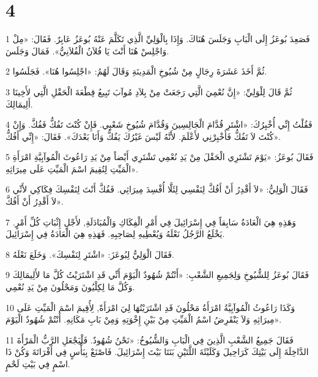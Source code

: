 \chapter{4}

\par 1 فَصَعِدَ بُوعَزُ إِلَى الْبَابِ وَجَلَسَ هُنَاكَ. وَإِذَا بِالْوَلِيِّ الَّذِي تَكَلَّمَ عَنْهُ بُوعَزُ عَابِرٌ. فَقَالَ: «مِلْ وَاجْلِسْ هُنَا أَنْتَ يَا فُلاَنُ الْفُلاَنِيُّ». فَمَالَ وَجَلَسَ.
\par 2 ثُمَّ أَخَذَ عَشَرَةَ رِجَالٍ مِنْ شُيُوخِ الْمَدِينَةِ وَقَالَ لَهُمُ: «اجْلِسُوا هُنَا». فَجَلَسُوا.
\par 3 ثُمَّ قَالَ لِلْوَلِيِّ: «إِنَّ نُعْمِيَ الَّتِي رَجَعَتْ مِنْ بِلاَدِ مُوآبَ تَبِيعُ قِطْعَةَ الْحَقْلِ الَّتِي لأَخِينَا أَلِيمَالِكَ.
\par 4 فَقُلْتُ إِنِّي أُخْبِرُكَ: «اشْتَرِ قُدَّامَ الْجَالِسِينَ وَقُدَّامَ شُيُوخِ شَعْبِي. فَإِنْ كُنْتَ تَفُكُّ فَفُكَّ. وَإِنْ كُنْتَ لاَ تَفُكُّ فَأَخْبِرْنِي لأَعْلَمَ. لأَنَّهُ لَيْسَ غَيْرُكَ يَفُكُّ وَأَنَا بَعْدَكَ». فَقَالَ: «إِنِّي أَفُكُّ».
\par 5 فَقَالَ بُوعَزُ: «يَوْمَ تَشْتَرِي الْحَقْلَ مِنْ يَدِ نُعْمِي تَشْتَرِي أَيْضاً مِنْ يَدِ رَاعُوثَ الْمُوآبِيَّةِ امْرَأَةِ الْمَيِّتِ لِتُقِيمَ اسْمَ الْمَيِّتِ عَلَى مِيرَاثِهِ».
\par 6 فَقَالَ الْوَلِيُّ: «لاَ أَقْدِرُ أَنْ أَفُكَّ لِنَفْسِي لِئَلَّا أُفْسِدَ مِيرَاثِي. فَفُكَّ أَنْتَ لِنَفْسِكَ فِكَاكِي لأَنِّي لاَ أَقْدِرُ أَنْ أَفُكَّ».
\par 7 وَهَذِهِ هِيَ الْعَادَةُ سَابِقاً فِي إِسْرَائِيلَ فِي أَمْرِ الْفِكَاكِ وَالْمُبَادَلَةِ, لأَجْلِ إِثْبَاتِ كُلِّ أَمْرٍ. يَخْلَعُ الرَّجُلُ نَعْلَهُ وَيُعْطِيهِ لِصَاحِبِهِ. فَهَذِهِ هِيَ الْعَادَةُ فِي إِسْرَائِيلَ.
\par 8 فَقَالَ الْوَلِيُّ لِبُوعَزَ: «اشْتَرِ لِنَفْسِكَ». وَخَلَعَ نَعْلَهُ.
\par 9 فَقَالَ بُوعَزُ لِلشُّيُوخِ وَلِجَمِيعِ الشَّعْبِ: «أَنْتُمْ شُهُودٌ الْيَوْمَ أَنِّي قَدِ اشْتَرَيْتُ كُلَّ مَا لأَلِيمَالِكَ وَكُلَّ مَا لِكِلْيُونَ وَمَحْلُونَ مِنْ يَدِ نُعْمِي.
\par 10 وَكَذَا رَاعُوثُ الْمُوآبِيَّةُ امْرَأَةُ مَحْلُونَ قَدِ اشْتَرَيْتُهَا لِيَ امْرَأَةً, لِأُقِيمَ اسْمَ الْمَيِّتِ عَلَى مِيرَاثِهِ وَلاَ يَنْقَرِضُ اسْمُ الْمَيِّتِ مِنْ بَيْنِ إِخْوَتِهِ وَمِنْ بَابِ مَكَانِهِ. أَنْتُمْ شُهُودٌ الْيَوْمَ».
\par 11 فَقَالَ جَمِيعُ الشَّعْبِ الَّذِينَ فِي الْبَابِ وَالشُّيُوخُ: «نَحْنُ شُهُودٌ. فَلْيَجْعَلِ الرَّبُّ الْمَرْأَةَ الدَّاخِلَةَ إِلَى بَيْتِكَ كَرَاحِيلَ وَكَلَيْئَةَ اللَّتَيْنِ بَنَتَا بَيْتَ إِسْرَائِيلَ. فَاصْنَعْ بِبَأْسٍ فِي أَفْرَاتَةَ وَكُنْ ذَا اسْمٍ فِي بَيْتِ لَحْمٍ.
